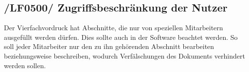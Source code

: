 \subsection{/LF0500/ Zugriffsbeschränkung der Nutzer}
Der Vierfachvordruck hat Abschnitte, die nur von speziellen Mitarbeitern ausgefüllt werden dürfen. Dies sollte auch in der Software beachtet werden. So soll jeder Mitarbeiter nur den zu ihn gehörenden Abschnitt bearbeiten beziehungsweise beschreiben, wodurch Verfälschungen des Dokuments verhindert werden sollen.